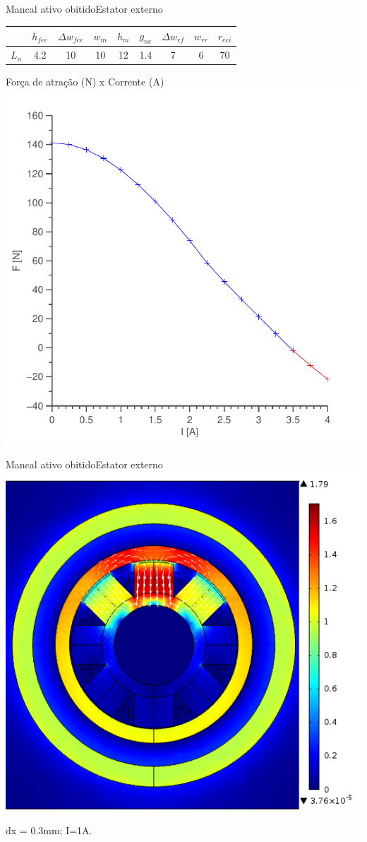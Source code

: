 \documentclass{beamer}
\begin{document}
\begin{frame}{Mancal ativo obitido}{Estator externo}
\centering
	\begin{tabular}{c c c c c c c c c}
		& $h_{fee}$ &$\Delta w_{fee}$ & $w_m$ & $h_m$  & $g_{ne}$ & $\Delta w_{rf}$ & $w_{rr}$ & $r_{eei}$ \\ \hline \hline
		$L_{n}$  	&  4.2 &   10 &   10 &    12 &   1.4 &  7 &   6 &    70 \\
	\end{tabular} 
	
\begin{center}
Força de atração (N) x Corrente (A)
\includegraphics[width=0.55\linewidth]{Simulacoes/Ativo/ativo_otimizado_fem_I_dx03}
\end{center}

\end{frame}

\begin{frame}{Mancal ativo obitido}{Estator externo}
\includegraphics[width=0.7\linewidth]{Simulacoes/Ativo/Cima_dx=03_I=1}

dx = 0.3mm; I=1A.

\end{frame}
\end{document}
